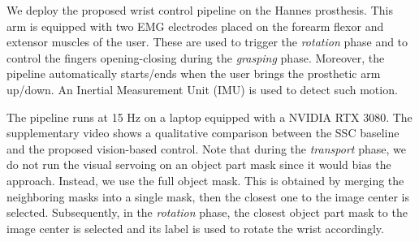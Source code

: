We deploy the proposed wrist control pipeline on the Hannes prosthesis. This arm is equipped with two EMG electrodes placed on the forearm flexor and extensor muscles of the user. These are used to trigger the \textit{rotation} phase and to control the fingers opening-closing during the \textit{grasping} phase. Moreover, the pipeline automatically starts/ends when the user brings the prosthetic arm up/down. An Inertial Measurement Unit (IMU) is used to detect such motion.

The pipeline runs at 15 Hz on a laptop equipped with a NVIDIA RTX 3080. The supplementary video shows a qualitative comparison between the SSC baseline and the proposed vision-based control. Note that during the \textit{transport} phase, we do not run the visual servoing on an object part mask since it would bias the approach. Instead, we use the full object mask. This is obtained by merging the neighboring masks into a single mask, then the closest one to the image center is selected. Subsequently, in the \textit{rotation} phase, the closest object part mask to the image center is selected and its label is used to rotate the wrist accordingly.

